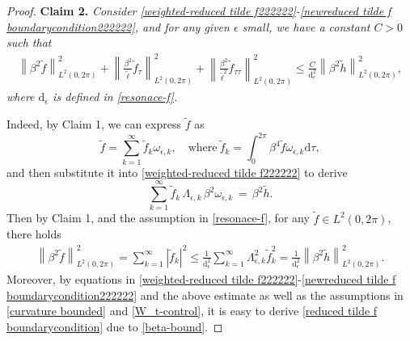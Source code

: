 \documentclass[10pt, reqno]{amsart}
\numberwithin{equation}{section}
\theoremstyle{definition}
\begin{document}
{\begin{proof}
\smallskip
\noindent
{\bf{Claim 2.}} \label{reduced tilde f boundarycondition-lemma22222}
{\em
Consider \eqref{weighted-reduced tilde f222222}-\eqref{newreduced tilde f boundarycondition222222},
and for any given $\epsilon$ small, we have a constant $C>0$ such that
\begin{align} \label{reduced tilde f boundarycondition}
\left\| \beta^2{\tilde f} \right\|_{L^2(0, 2\pi)}^2
+\left\| \frac{\beta^2}{\tilde\ell}{\tilde f}_\tau \right\|_{L^2(0, 2\pi)}^2
+\left\| \frac{\beta^2}{{\tilde\ell}^2}{\tilde f}_{\tau\tau} \right\|_{L^2(0, 2\pi)}^2
\leq
\frac{C}{{\mathrm d}_\epsilon^2}\left\| \beta^2{\tilde h} \right\|_{L^2(0, 2\pi)}^2,
\end{align}
where ${\mathrm d}_\epsilon$ is defined in \eqref{resonace-f}.
}

\noindent
Indeed, by Claim 1, %
we can express $\tilde f$ as
\[
\tilde f= \sum_{k=1}^\infty {\tilde f}_k \omega_{\epsilon, k}, \quad \text{where}~ {\tilde f}_k =\int_0^{2\pi} \beta^4 \tilde f \omega_{\epsilon, k}{\mathrm d}\tau,
\]
 and then substitute it into \eqref{weighted-reduced tilde f222222} to derive
\[
 \sum_{k=1}^\infty {\tilde f}_k\, \Lambda_{\epsilon, k}\,\beta^2\omega_{\epsilon, k}\,=\,\beta^2{\tilde h}.
\]
Then by Claim 1,
and the assumption in \eqref{resonace-f}, for any $\tilde f\in L^2(0, 2\pi)$, there holds
\begin{align*}
\left\| \beta^2{\tilde f} \right\|_{L^2(0, 2\pi)}^2
=\sum_{k=1}^\infty |{\tilde f}_k|^2
\leq \frac1{{\mathrm d}_\epsilon^2} \sum_{k=1}^\infty \Lambda_{\epsilon, k}^2 {\tilde f}_k^2
= \frac1{{\mathrm d}_\epsilon^2}\left\| \beta^2{\tilde h} \right\|_{L^2(0, 2\pi)}^2.
\end{align*}
Moreover, by equations in \eqref{weighted-reduced tilde f222222}-\eqref{newreduced tilde f boundarycondition222222}
and the above estimate as well as the assumptions in \eqref{curvature bounded} and \eqref{W_t-control},
it is easy to derive \eqref{reduced tilde f boundarycondition} due to \eqref{beta-bound}.





\end{proof}}
\end{document}
